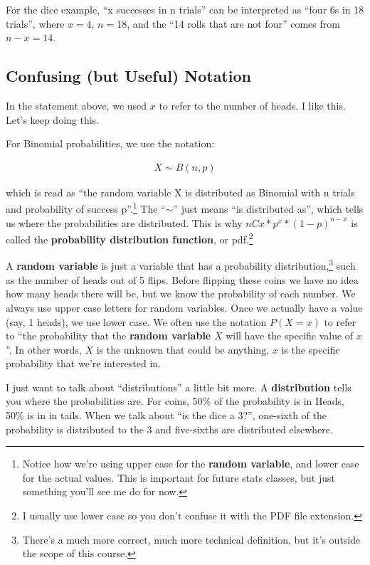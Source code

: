 \documentclass[
  letterpaper,
  DIV=11,
  numbers=noendperiod,
  oneside]{scrreprt}
\begin{document}
For the dice example, ``x successes in n trials'' can be interpreted as
``four 6s in 18 trials'', where \(x=4\), \(n=18\), and the ``14 rolls
that are not four'' comes from \(n-x=14\).

\hypertarget{confusing-but-useful-notation}{%
\subsection{Confusing (but Useful)
Notation}\label{confusing-but-useful-notation}}

In the statement above, we used \(x\) to refer to the number of heads. I
like this. Let's keep doing this.

For Binomial probabilities, we use the notation:

\begin{align*}
X \sim B(n,p)
\end{align*}

which is read as ``the random variable X is distributed as Binomial with
n trials and probability of success p''.\footnote{Notice how we're using
  upper case for the \textbf{random variable}, and lower case for the
  actual values. This is important for future stats classes, but just
  something you'll see me do for now.} The ``\(\sim\)'' just means ``is
distributed as'', which tells us where the probabilities are
distributed. This is why \(nCx*p^x*(1-p)^{n-x}\) is called the
\textbf{probability distribution function}, or pdf.\footnote{I usually
  use lower case so you don't confuse it with the PDF file extension.}

A \textbf{random variable} is just a variable that has a probability
distribution,\footnote{There's a much more correct, much more technical
  definition, but it's outside the scope of this course.} such as the
number of heads out of 5 flips. Before flipping these coins we have no
idea how many heads there will be, but we know the probability of each
number. We always use upper case letters for random variables. Once we
actually have a value (say, 1 heads), we use lower case. We often use
the notation \(P(X = x)\) to refer to ``the probability that the
\textbf{random variable} \(X\) will have the specific value of \(x\)''.
In other words, \(X\) is the unknown that could be anything, \(x\) is
the specific probability that we're interested in.

I just want to talk about ``distributions'' a little bit more. A
\textbf{distribution} tells you where the probabilities are. For coins,
50\% of the probability is in Heads, 50\% is in in tails. When we talk
about ``is the dice a 3?'', one-sixth of the probability is distributed
to the 3 and five-sixths are distributed elsewhere.
\end{document}
